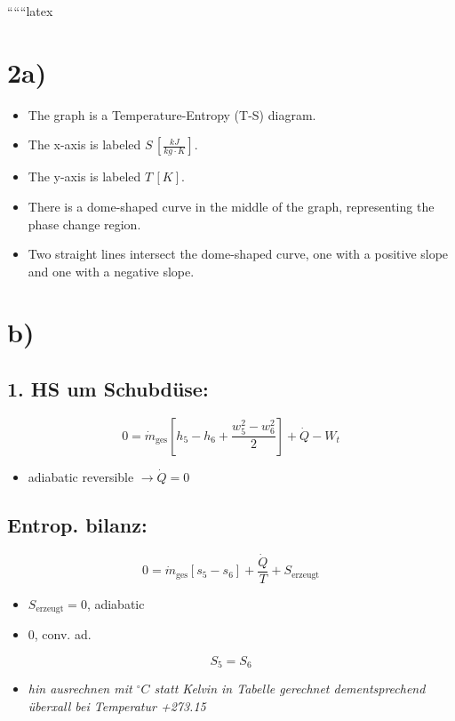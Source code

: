 
``````latex


\section*{2a)}

\begin{itemize}
    \item The graph is a Temperature-Entropy (T-S) diagram.
    \item The x-axis is labeled $S \, [\frac{kJ}{kg \cdot K}]$.
    \item The y-axis is labeled $T \, [K]$.
    \item There is a dome-shaped curve in the middle of the graph, representing the phase change region.
    \item Two straight lines intersect the dome-shaped curve, one with a positive slope and one with a negative slope.
\end{itemize}

\section*{b)}

\subsection*{1. HS um Schubdüse:}

\[
0 = \dot{m}_{\text{ges}} \left[ h_5 - h_6 + \frac{w_5^2 - w_6^2}{2} \right] + \dot{Q} - W_t
\]

\begin{itemize}
    \item adiabatic reversible $\rightarrow \dot{Q} = 0$
\end{itemize}

\subsection*{Entrop. bilanz:}

\[
0 = \dot{m}_{\text{ges}} \left[ s_5 - s_6 \right] + \frac{\dot{Q}}{T} + S_{\text{erzeugt}}
\]

\begin{itemize}
    \item $S_{\text{erzeugt}} = 0$, adiabatic
    \item $0$, conv. ad.
\end{itemize}

\[
S_5 = S_6
\]

\begin{itemize}
    \item \textit{hin ausrechnen mit $^\circ C$ statt Kelvin in Tabelle gerechnet dementsprechend überxall bei Temperatur +273.15}
\end{itemize}

